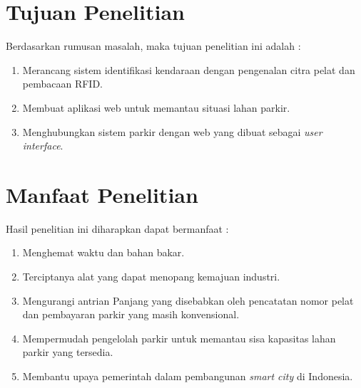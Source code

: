 \section{Tujuan Penelitian}
Berdasarkan rumusan masalah, maka tujuan penelitian ini adalah :
\begin{enumerate}[topsep=0pt,itemsep=0pt,partopsep=0pt, parsep=0pt]
    \item Merancang sistem identifikasi kendaraan dengan pengenalan citra pelat dan pembacaan RFID. 
    \item Membuat aplikasi web untuk memantau situasi lahan parkir.
    \item Menghubungkan sistem parkir dengan web yang dibuat sebagai \textit{user interface}.
\end{enumerate}

\section{Manfaat Penelitian}
Hasil penelitian ini diharapkan dapat bermanfaat :
\begin{enumerate}[topsep=0pt,itemsep=0pt,partopsep=0pt, parsep=0pt]
    \item Menghemat waktu dan bahan bakar.
    \item Terciptanya alat yang dapat menopang kemajuan industri.
    \item Mengurangi antrian Panjang yang disebabkan oleh pencatatan nomor pelat dan pembayaran parkir yang masih konvensional.
    \item Mempermudah pengelolah parkir untuk memantau sisa kapasitas lahan parkir yang tersedia.
    \item Membantu upaya pemerintah dalam pembangunan \textit{smart city} di Indonesia.
\end{enumerate}

